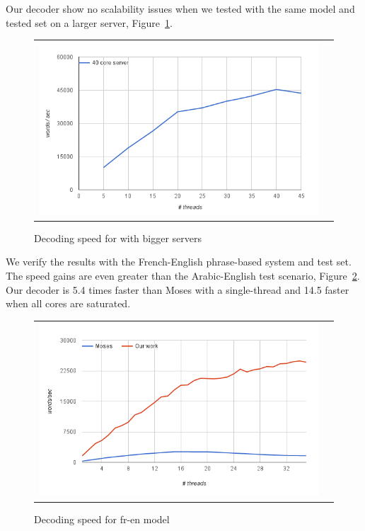 \documentclass[11pt]{article}
\begin{document}
Our decoder show no scalability issues when we tested with the same model and tested set on a larger server, Figure~\ref{fig:more-cores}.
\begin{figure}[h]
\centering
\begin{tabular}{cc}
{\includegraphics[scale=0.4]{more-cores.png}} 
\end{tabular}
\caption{Decoding speed for with bigger servers}
\label{fig:more-cores}
\end{figure} 

We verify the results with the French-English phrase-based system and test set. The speed gains are even greater than the Arabic-English test scenario, Figure~\ref{fig:fr-en-speed}. Our decoder is 5.4 times faster than Moses with a single-thread and 14.5 faster when all cores are saturated.
\begin{figure}[h]
\centering
\begin{tabular}{cc}
{\includegraphics[scale=0.4]{fr-en-speed.png}} 
\end{tabular}
\caption{Decoding speed for fr-en model}
\label{fig:fr-en-speed}
\end{figure} 
\end{document}
